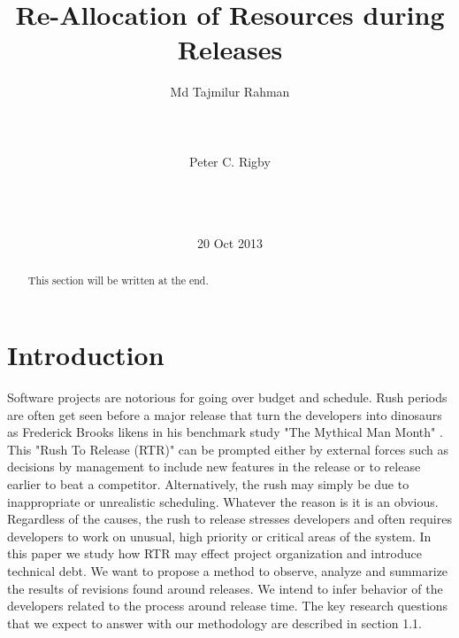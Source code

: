 \documentclass{acm_proc_article-sp}
\begin{document}
\title{Re-Allocation of Resources during Releases }
\author{
\alignauthor
Md Tajmilur Rahman\\
       \\
       \\
       \\
\alignauthor
Peter C. Rigby\\
       \\
       \\
       \\
}
\date{20 Oct 2013}
\maketitle
\begin{abstract}
This section will be written at the end.
\end{abstract}
\section{Introduction}
Software projects are notorious for going over budget and schedule. Rush periods are often get seen before a major release that turn the developers into dinosaurs as Frederick Brooks likens in his benchmark study "The Mythical Man Month" \cite{brooks_mythical}. This "Rush To Release (RTR)" can be prompted either by external forces such as decisions by management to include new features in the release or to release earlier to beat a competitor. Alternatively, the rush may simply be due to inappropriate or unrealistic scheduling. Whatever the reason is it is an obvious. Regardless of the causes, the rush to release stresses developers and often requires developers to work on unusual, high priority or critical areas of the system. In this paper we study how RTR may effect project organization and introduce technical debt. We want to propose a method to observe, analyze and summarize the results of revisions found around releases. We intend to infer behavior of the developers related to the process around release time. The key research questions that we expect to answer with our methodology are described in section 1.1.
\end{document}

